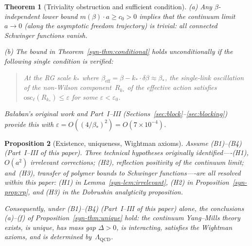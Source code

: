 \documentclass[11pt]{article}
\newtheorem{theorem}{Theorem}[section]
\newtheorem{proposition}[theorem]{Proposition}
\theoremstyle{definition}
\newcommand{\osc}{\mathrm{osc}}
\begin{document}
\begin{theorem}[Triviality obstruction and sufficient
condition]\label{syn-thm:obstruction}
\textup{(a)} Any $\beta$-independent lower bound
$m(\beta) \cdot a \geq c_0 > 0$ implies that the continuum
limit $a \to 0$ (along the asymptotic freedom trajectory)
is trivial: all connected Schwinger functions vanish.

\textup{(b)} The bound in Theorem~\ref{syn-thm:conditional}
holds unconditionally if the following single condition
is verified:
\begin{quote}
\emph{At the RG scale $k_*$ where
$\beta_{\mathrm{eff}} = \beta - k_*\cdot\delta\beta
\approx \beta_*$,
the single-link oscillation of the non-Wilson
component~$R_{k_*}$ of the effective action satisfies
$\osc_\ell(R_{k_*}) \leq \varepsilon$ for some
$\varepsilon < \varepsilon_0$.}
\end{quote}
Ba{\l}aban's original work and Part~I--III
(Sections~\ref{sec:block}--\ref{sec:blocking}) provide this with
$\varepsilon = O((4/\beta_*)^2) = O(7\times 10^{-4})$.
\end{theorem}

\begin{proposition}[Existence, uniqueness,
Wightman axioms]\label{syn-thm:full}
Assume (B1)--(B4) (Part~I--III of this paper).
Three technical hypotheses originally identified----(H1),
$O(a^2)$ irrelevant corrections; (H2), reflection
positivity of the continuum limit; and~(H3), transfer
of polymer bounds to Schwinger functions----are all
resolved within this paper:
\textup{(H1)} in Lemma~\ref{syn-lem:irrelevant},
\textup{(H2)} in Proposition~\ref{syn-prop:rp},
and \textup{(H3)} in
the Dobrushin analyticity proposition.

Consequently, under (B1)--(B4) (Part~I--III of this paper) alone,
the conclusions \textup{(a)--(f)} of
Proposition~\ref{syn-thm:unique} hold: the continuum
Yang--Mills theory exists, is unique, has mass gap
$\Delta > 0$, is interacting, satisfies the Wightman
axioms, and is determined by~$\Lambda_{\mathrm{QCD}}$.
\end{proposition}
\end{document}
